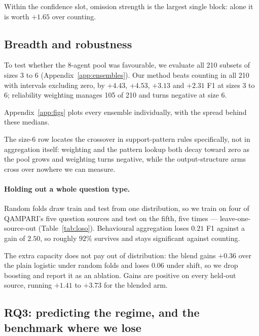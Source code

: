 \documentclass{article}
\begin{document}
Within the confidence slot, omission strength is the largest single block: alone it is worth $+1.65$ over counting.

\subsection{Breadth and robustness}
\label{sec:breadth}
\label{sec:robust}

To test whether the 8-agent pool was favourable, we evaluate all 210 subsets of sizes 3 to 6 (Appendix~\ref{app:ensembles}). Our method beats counting in all 210 with intervals excluding zero, by $+4.43$, $+4.53$, $+3.13$ and $+2.31$ F1 at sizes 3 to 6; reliability weighting manages 105 of 210 and turns negative at size 6.




Appendix~\ref{app:figs} plots every ensemble individually, with the spread behind these medians.

The size-6 row locates the crossover in support-pattern rules specifically, not in aggregation itself: weighting and the pattern lookup both decay toward zero as the pool grows and weighting turns negative, while the output-structure arms cross over nowhere we can measure.

\paragraph{Holding out a whole question type.}
Random folds draw train and test from one distribution, so we train on four of QAMPARI's five question sources and test on the fifth, five times --- leave-one-source-out (Table~\ref{tab:loso}). Behavioural aggregation loses $0.21$ F1 against a gain of $2.50$, so roughly $92\%$ survives and stays significant against counting.



The extra capacity does not pay out of distribution: the blend gains $+0.36$ over the plain logistic under random folds and loses $0.06$ under shift, so we drop boosting and report it as an ablation. Gains are positive on every held-out source, running $+1.41$ to $+3.73$ for the blended arm. %

\subsection{RQ3: predicting the regime, and the benchmark where we lose}
\label{sec:rq3}
\end{document}
